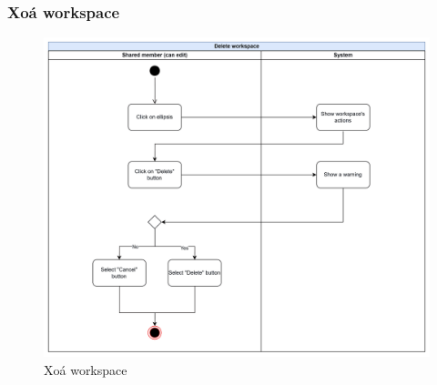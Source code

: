 \subsubsection{Xoá workspace}
    \begin{figure}[H]
        \centering
        \includegraphics[width=\linewidth]{Content/Phân tích và thiết kế hệ thống/documents/Sơ đồ hoạt động/images/deleteWorkspace.png}
        \vspace{0.5cm}
        \caption{Xoá workspace}
        \label{fig:Xoá workspace}
    \end{figure}